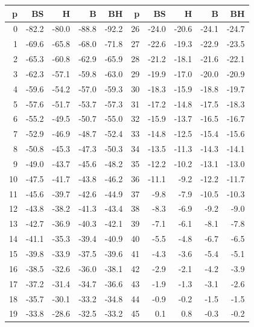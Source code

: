 \documentclass[a4paper,10pt,titlepage,oneside,openany]{book}
\theoremstyle{plain}
\theoremstyle{definition}
\theoremstyle{remark}
\begin{document}
\clearpage
\begin{table}[p]
\centering
\fontsize{7.4}{8.4}\selectfont
\setlength{\tabcolsep}{3.2pt}
\begin{tabular}{@{}rrrrr@{\hspace{8mm}}rrrrr@{}}
\toprule
p & BS & H & B & BH & p & BS & H & B & BH \\
\midrule
0 & -82.2 & -80.0 & -88.8 & -92.2 & 26 & -24.0 & -20.6 & -24.1 & -24.7 \\
1 & -69.6 & -65.8 & -68.0 & -71.8 & 27 & -22.6 & -19.3 & -22.9 & -23.5 \\
2 & -65.3 & -60.8 & -62.9 & -65.9 & 28 & -21.2 & -18.1 & -21.6 & -22.1 \\
3 & -62.3 & -57.1 & -59.8 & -63.0 & 29 & -19.9 & -17.0 & -20.0 & -20.9 \\
4 & -59.6 & -54.2 & -57.0 & -59.3 & 30 & -18.3 & -15.9 & -18.8 & -19.7 \\
5 & -57.6 & -51.7 & -53.7 & -57.3 & 31 & -17.2 & -14.8 & -17.5 & -18.3 \\
6 & -55.2 & -49.5 & -50.7 & -55.0 & 32 & -15.9 & -13.7 & -16.5 & -16.7 \\
7 & -52.9 & -46.9 & -48.7 & -52.4 & 33 & -14.8 & -12.5 & -15.4 & -15.6 \\
8 & -50.8 & -45.3 & -47.3 & -50.3 & 34 & -13.5 & -11.3 & -14.3 & -14.1 \\
9 & -49.0 & -43.7 & -45.6 & -48.2 & 35 & -12.2 & -10.2 & -13.1 & -13.0 \\
10 & -47.5 & -41.7 & -43.8 & -46.2 & 36 & -11.1 & -9.2 & -12.2 & -11.7 \\
11 & -45.6 & -39.7 & -42.6 & -44.9 & 37 & -9.8 & -7.9 & -10.5 & -10.3 \\
12 & -43.8 & -38.2 & -41.3 & -43.4 & 38 & -8.3 & -6.9 & -9.2 & -9.0 \\
13 & -42.7 & -36.9 & -40.3 & -42.1 & 39 & -7.1 & -6.1 & -8.1 & -7.8 \\
14 & -41.1 & -35.3 & -39.4 & -40.9 & 40 & -5.5 & -4.8 & -6.7 & -6.5 \\
15 & -39.8 & -33.9 & -37.5 & -39.6 & 41 & -4.3 & -3.6 & -5.4 & -5.1 \\
16 & -38.5 & -32.6 & -36.0 & -38.1 & 42 & -2.9 & -2.1 & -4.2 & -3.9 \\
17 & -37.2 & -31.4 & -34.7 & -36.6 & 43 & -1.9 & -1.3 & -3.1 & -2.6 \\
18 & -35.7 & -30.1 & -33.2 & -34.8 & 44 & -0.9 & -0.2 & -1.5 & -1.5 \\
19 & -33.8 & -28.6 & -32.5 & -33.2 & 45 & 0.1 & 0.8 & -0.3 & -0.2 \\

\end{tabular}
\end{table}
\end{document}
